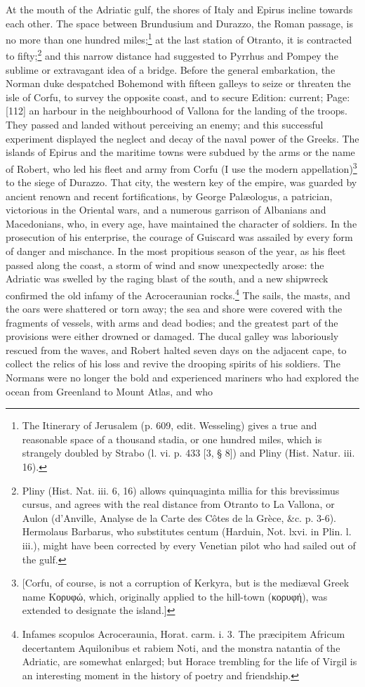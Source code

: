 At the mouth of the Adriatic gulf, the shores of Italy and Epirus incline towards each other. The space between Brundusium and Durazzo, the Roman passage, is no more than one hundred miles;\footnote{The Itinerary of Jerusalem (p. 609, edit. Wesseling) gives a true and reasonable space of a thousand stadia, or one hundred miles, which is strangely doubled by Strabo (l. vi. p. 433 [3, § 8]) and Pliny (Hist. Natur. iii. 16).} at the last station of Otranto, it is contracted to fifty;\footnote{Pliny (Hist. Nat. iii. 6, 16) allows quinquaginta millia for this brevissimus cursus, and agrees with the real distance from Otranto to La Vallona, or Aulon (d\texthebrew{}’Anville, Analyse de la Carte des Côtes de la Grèce, \&c. p. 3-6). Hermolaus Barbarus, who substitutes centum (Harduin, Not. lxvi. in Plin. l. iii.), might have been corrected by every Venetian pilot who had sailed out of the gulf.} and this narrow distance had suggested to Pyrrhus and Pompey the sublime or extravagant idea of a bridge. Before the general embarkation, the Norman duke despatched Bohemond with fifteen galleys to seize or threaten the isle of Corfu, to survey the opposite coast, and to secure Edition: current; Page: [112] an harbour in the neighbourhood of Vallona for the landing of the troops. They passed and landed without perceiving an enemy; and this successful experiment displayed the neglect and decay of the naval power of the Greeks. The islands of Epirus and the maritime towns were subdued by the arms or the name of Robert, who led his fleet and army from Corfu (I use the modern appellation)\footnote{[Corfu, of course, is not a corruption of Kerkyra, but is the mediæval Greek name \textgreek{Κορυφώ}, which, originally applied to the hill-town (\textgreek{κορυφή}), was extended to designate the island.]} to the siege of Durazzo. That city, the western key of the empire, was guarded by ancient renown and recent fortifications, by George Palæologus, a patrician, victorious in the Oriental wars, and a numerous garrison of Albanians and Macedonians, who, in every age, have maintained the character of soldiers. In the prosecution of his enterprise, the courage of Guiscard was assailed by every form of danger and mischance. In the most propitious season of the year, as his fleet passed along the coast, a storm of wind and snow unexpectedly arose: the Adriatic was swelled by the raging blast of the south, and a new shipwreck confirmed the old infamy of the Acroceraunian rocks.\footnote{Infames scopulos Acroceraunia, Horat. carm. i. 3. The præcipitem Africum decertantem Aquilonibus et rabiem Noti, and the monstra natantia of the Adriatic, are somewhat enlarged; but Horace trembling for the life of Virgil is an interesting moment in the history of poetry and friendship.} The sails, the masts, and the oars were shattered or torn away; the sea and shore were covered with the fragments of vessels, with arms and dead bodies; and the greatest part of the provisions were either drowned or damaged. The ducal galley was laboriously rescued from the waves, and Robert halted seven days on the adjacent cape, to collect the relics of his loss and revive the drooping spirits of his soldiers. The Normans were no longer the bold and experienced mariners who had explored the ocean from Greenland to Mount Atlas, and who 